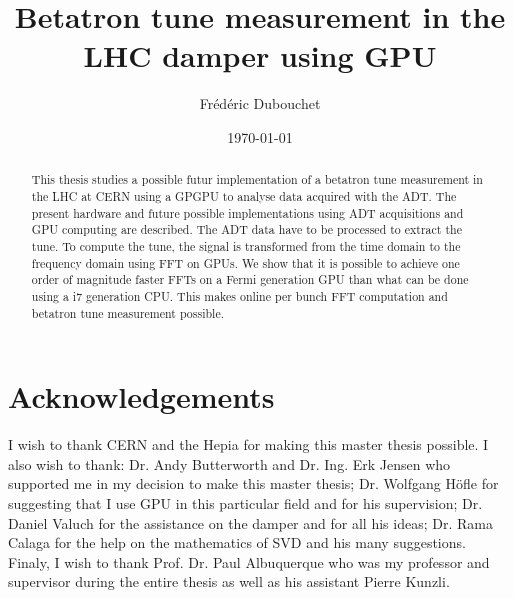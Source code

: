 \documentclass[a4paper]{report}
\title{Betatron tune measurement in the LHC damper using GPU}
\author{Fr{\'e}d{\'e}ric Dubouchet}
\date{\today}
\begin{document}


\begin{abstract}
  This thesis studies a possible futur implementation of a betatron
  tune measurement in the \gls{LHC} at \gls{CERN} using a \gls{GPGPU}
  to analyse data acquired with the \gls{ADT}. The present hardware
  and future possible implementations using \gls{ADT} acquisitions and
  \gls{GPU} computing are described. The \gls{ADT} data have to be
  processed to extract the \gls{tune}. To compute the tune, the signal
  is transformed from the time domain to the frequency domain using
  \gls{FFT} on \glspl{GPU}. We show that it is possible to achieve one
  order of magnitude faster \glspl{FFT} on a Fermi generation
  \gls{GPU} than what can be done using a i7 generation
  \gls{CPU}. This makes online per \gls{bunch} \gls{FFT} computation
  and betatron tune measurement possible.
\end{abstract}

\chapter*{Acknowledgements}

I wish to thank \gls{CERN} and the \gls{Hepia} for making this master
thesis possible. I also wish to thank: Dr. Andy Butterworth and
Dr. Ing. Erk Jensen who supported me in my decision to make this
master thesis; Dr. Wolfgang H{\"o}fle for suggesting that I use GPU in
this particular field and for his supervision; Dr. Daniel Valuch for
the assistance on the damper and for all his ideas; Dr. Rama Calaga
for the help on the mathematics of \gls{SVD} and his many
suggestions. Finaly, I wish to thank Prof. Dr. Paul Albuquerque who
was my professor and supervisor during the entire thesis as well as
his assistant Pierre Kunzli.

\tableofcontents
\listoffigures
\listoftables









\printglossaries


\end{document}
